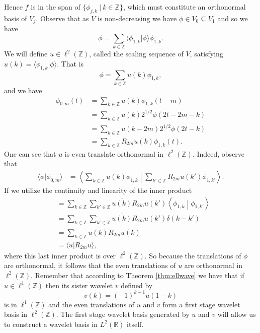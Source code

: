 \documentclass{report}
\newcommand{\Z}{\mathbb{Z}}
\newcommand{\R}{\mathbb{R}}
\begin{document}
Hence $f$ is in the span of $\{ \phi_{j,k} \ | \ k\in \Z \}$, which must constitute an orthonormal basis of $V_j$.
Observe that as $V$ is non-decreasing we have $\phi \in V_0 \subseteq V_1$ and so we have
$$
\phi=\sum_{k \in \Z} \langle \phi_{1,k}| \phi \rangle \phi_{1,k}.
$$
We will define $u \in \ell^2 (\Z)$, called the scaling sequence of $V$, satisfying $u(k)=\langle \phi_{1,k}| \phi\rangle$. That is
$$
\phi=\sum_{k \in \Z} u(k) \phi_{1,k},
$$
and we have
\begin{align*}
\phi_{0,m}(t)&=\sum_{k \in \Z} u(k) \phi_{1,k}(t-m)\\
&=\sum_{k \in \Z} u(k) 2^{1/2}\phi(2t-2m-k)\\
&=\sum_{k \in \Z} u(k-2m) 2^{1/2} \phi(2t-k)\\
&=\sum_{k \in \Z} R_{2m}u(k) \phi_{1,k}(t).
\end{align*}
One can see that $u$ is even translate orthonormal in $\ell^2 (\Z)$. Indeed, observe that 
\begin{align*}
\langle \phi | \phi_{0,m}\rangle &=\left \langle \sum_{k\in \Z} u(k)\phi_{1,k}\middle | \sum_{k'\in \Z} R_{2m}u(k')\phi_{1,k'} \right \rangle.
\end{align*}
If we utilize the continuity and linearity of the inner product
\begin{align*}
&= \sum_{k\in \Z} \sum_{k'\in \Z} \overline{ u(k)} R_{2m}u(k') \left \langle\phi_{1,k}\middle | \phi_{1,k'} \right \rangle\\
&= \sum_{k\in \Z} \sum_{k'\in \Z} \overline{ u(k)} R_{2m}u(k') \delta(k-k')\\
&= \sum_{k\in \Z} \overline{ u(k)} R_{2m}u(k) \\
&= \langle u | R_{2m} u \rangle,
\end{align*}
where this last inner product is over $\ell^2 (\Z)$. So because the translations of $\phi$ are orthonormal, it follows that the even translations of $u$ are orthonormal in $\ell^2 (\Z)$. Remember that according to Theorem \ref{thm:ellwave} we have that if $u \in \ell^1 (\Z)$ then its sister wavelet $v$ defined by
$$
v(k)=(-1)^{k-1}\overline{u(1-k)}
$$
is in $\ell^1 (\Z)$ and the even translations of $u$ and $v$ form a first stage wavelet basis in $\ell^2 (\Z)$. The first stage wavelet basis generated by $u$ and $v$ will allow us to construct a wavelet basis in $L^2 (\R)$ itself.
\end{document}
